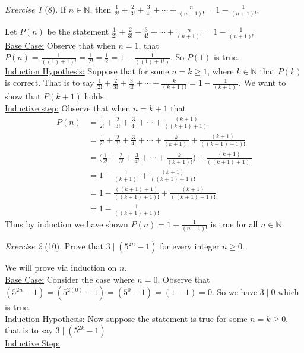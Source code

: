 \documentclass[12pt]{amsart}
\makeatletter
\theoremstyle{remark}
\newtheorem*{exercise}{Exercise}%
\def\NN{\ensuremath{\mathbb N}}
\renewenvironment{proof}[1][\proofname]{\par\doublespacing
  \pushQED{\qed}%
  \normalfont \topsep6\p@\@plus6\p@\relax
  \list{}{%
    \settowidth{\leftmargin}{\itshape\proofname:\hskip\labelsep}%
    \setlength{\labelwidth}{0pt}%
    \setlength{\itemindent}{-\leftmargin}%
  }%
  \item[\hskip\labelsep\itshape#1\@addpunct{:}]\ignorespaces
}{%
  \popQED\endlist\@endpefalse
  \singlespacing
}
\theoremstyle{mycomment}
\makeatother
\begin{document}
\begin{exercise}[8] If $n\in\NN$, then $\frac{1}{2!}+\frac{2}{3!}+\frac{3}{4!}+\cdots+\frac{n}{(n+1)!}=1-\frac{1}{(n+1)!}$.
\begin{proof}%
  Let $P(n)$ be the statement $\frac{1}{2!}+\frac{2}{3!}+\frac{3}{4!}+\cdots+\frac{n}{(n+1)!}=1-\frac{1}{(n+1)!}$ \\
  \underline{Base Case:} Observe that when $n = 1$, that $P(n) = \frac{1}{((1)+1)!} = \frac{1}{2!} = \frac{1}{2} = 1 - \frac{1}{((1) + 1!)}$. So $P(1)$ is true. \\
  \underline{Induction Hypothesis:} Suppose that for some $n = k \geq 1$, where $k \in \NN$ that $P(k)$ is correct. That is to say $\frac{1}{2!} + \frac{2}{3!} + \frac{3}{4!} + \cdots + \frac{k}{(k+1)!} = 1 - \frac{1}{(k+1)!}$. We want to show that $P(k+1)$ holds.\\
  \underline{Inductive step:} Observe that when $n = k+1$ that \\
  \begin{align*}
    P(n) &= \frac{1}{2!} + \frac{2}{3!} + \frac{3}{4!} + \cdots + \frac{(k+1)}{((k+1)+1)!} \\
         &= \frac{1}{2!} + \frac{2}{3!} + \frac{3}{4!} + \cdots + \frac{k}{(k+1)!} + \frac{(k+1)}{((k+1)+1)!}  \\
         &= \biggl(\frac{1}{2!} + \frac{2}{3!} + \frac{3}{4!} + \cdots + \frac{k}{(k+1)!}\biggr) + \frac{(k+1)}{((k+1)+1)!}  \\
         &= 1 - \frac{1}{(k+1)!} + \frac{(k+1)}{((k+1)+1)!}  \\
         &= 1 - \frac{((k+1)+1)}{((k+1)+1)!} + \frac{(k+1)}{((k+1)+1)!} \\
         &= 1 - \frac{1}{((k+1)+1)!}
  \end{align*}
  Thus by induction we have shown $P(n) = 1 - \frac{1}{(n+1)!}$ is true for all $n \in \NN$.
\end{proof}
\end{exercise}

\begin{exercise}[10] Prove that $3\mid(5^{2n}-1)$ for every integer $n\ge 0$.
\begin{proof}
  We will prove via induction on $n$. \\
  \underline{Base Case:} Consider the case where $n=0$. Observe that $(5^{2n} -1) = (5^{2(0)} - 1) =( 5^0 - 1) =( 1 - 1) = 0$. So we have $3 \mid 0$ which is true.  \\
  \underline{Induction Hypothesis:} Now suppose the statement is true for some $n = k \geq 0$, that is to say $ 3 \mid (5^{2k} - 1)$\\
  \underline{Inductive Step:} \\
\end{proof}
\end{exercise}
\end{document}
